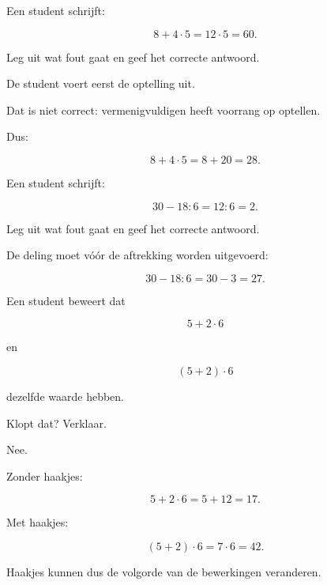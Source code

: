\documentclass{ximera}
\begin{document}
\begin{oefening}{\oefU}

\begin{question}

Een student schrijft:

\[
8+4\cdot5
=
12\cdot5
=
60.
\]

Leg uit wat fout gaat en geef het correcte antwoord.

\begin{oplossing}

De student voert eerst de optelling uit.

Dat is niet correct: vermenigvuldigen heeft voorrang op optellen.

Dus:

\[
8+4\cdot5
=
8+20
=
28.
\]

\end{oplossing}

\end{question}


\begin{question}

Een student schrijft:

\[
30-18:6
=
12:6
=
2.
\]

Leg uit wat fout gaat en geef het correcte antwoord.

\begin{oplossing}

De deling moet vóór de aftrekking worden uitgevoerd:

\[
30-18:6
=
30-3
=
27.
\]

\end{oplossing}

\end{question}


\begin{question}

Een student beweert dat

\[
5+2\cdot6
\]

en

\[
(5+2)\cdot6
\]

dezelfde waarde hebben.

Klopt dat? Verklaar.

\begin{oplossing}

Nee.

Zonder haakjes:

\[
5+2\cdot6
=
5+12
=
17.
\]

Met haakjes:

\[
(5+2)\cdot6
=
7\cdot6
=
42.
\]

Haakjes kunnen dus de volgorde van de bewerkingen veranderen.

\end{oplossing}

\end{question}

\end{oefening}
\end{document}
